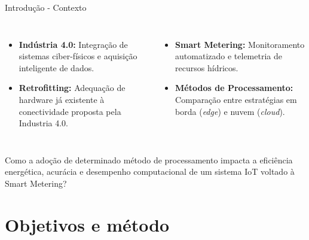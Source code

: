 \documentclass[
    aspectratio=169,
    12pt,
    brazil
]{beamer}
\begin{document}
\begin{frame}[fragile]{Introdução - Contexto}
    \centering
    \vfill
    \begin{columns}[T,onlytextwidth]
        \begin{itemize}\scriptsize
          \setlength{\itemsep}{3pt}
          \item \textbf{Indústria 4.0:} Integração de sistemas ciber-físicos e aquisição inteligente de dados.
          \item \textbf{Retrofitting:} Adequação de hardware já existente à conectividade proposta pela Industria 4.0.
        \end{itemize}
        \begin{itemize}\scriptsize
          \setlength{\itemsep}{3pt}
          \item \textbf{Smart Metering:} Monitoramento automatizado e telemetria de recursos hídricos.
          \item \textbf{Métodos de Processamento:} Comparação entre estratégias em borda (\emph{edge}) e nuvem (\emph{cloud}).
        \end{itemize}
      \end{columns}
      \vspace{0.4cm}
      {\footnotesize Como a adoção de determinado método de processamento 
        impacta a eficiência energética, acurácia e desempenho 
        computacional de um sistema IoT voltado à Smart Metering?}
      \vfill
\end{frame}
\section{Objetivos e método}
\end{document}
